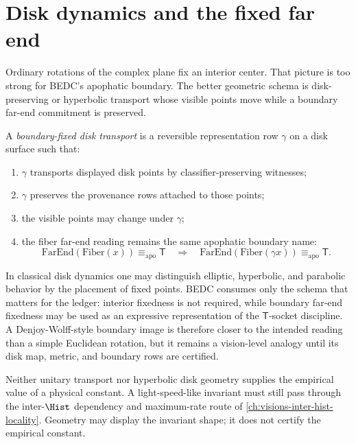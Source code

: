 \section{Disk dynamics and the fixed far end}
\label{sec:hyperbolic-disk-dynamics-fixed-end}

Ordinary rotations of the complex plane fix an interior center. That picture is too strong for BEDC's apophatic boundary. The better geometric schema is disk-preserving or hyperbolic transport whose visible points move while a boundary far-end commitment is preserved.

\begin{definition}
\label{def:hyperbolic-boundary-fixed-disk-transport}
A \emph{boundary-fixed disk transport} is a reversible representation row $\gamma$ on a disk surface such that:
\begin{enumerate}
\item $\gamma$ transports displayed disk points by classifier-preserving witnesses;
\item $\gamma$ preserves the provenance rows attached to those points;
\item the visible points may change under $\gamma$;
\item the fiber far-end reading remains the same apophatic boundary name:
$$
\mathrm{FarEnd}(\mathrm{Fiber}(x))\equiv_{\mathrm{apo}}\mathsf{T}
\quad\Rightarrow\quad
\mathrm{FarEnd}(\mathrm{Fiber}(\gamma x))\equiv_{\mathrm{apo}}\mathsf{T}.
$$
\end{enumerate}
\end{definition}

In classical disk dynamics one may distinguish elliptic, hyperbolic, and parabolic behavior by the placement of fixed points. BEDC consumes only the schema that matters for the ledger: interior fixedness is not required, while boundary far-end fixedness may be used as an expressive representation of the $\mathsf{T}$-socket discipline. A Denjoy-Wolff-style boundary image is therefore closer to the intended reading than a simple Euclidean rotation, but it remains a vision-level analogy until its disk map, metric, and boundary rows are certified.

\begin{principle}
\label{prin:hyperbolic-no-constant-from-geometry-alone}
Neither unitary transport nor hyperbolic disk geometry supplies the empirical value of a physical constant. A light-speed-like invariant must still pass through the inter-$\Hist$ dependency and maximum-rate route of \autoref{ch:visions-inter-hist-locality}. Geometry may display the invariant shape; it does not certify the empirical constant.
\end{principle}

